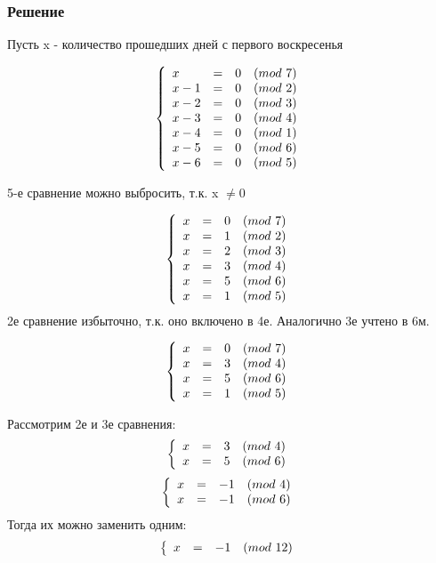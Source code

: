 \documentclass[10pt,a4paper]{article}
\begin{document}
\subsubsection*{Решение}
Пусть x - количество прошедших дней с первого воскресенья

\[
\left\{ \begin{array}{llll}
x& = &0 &(mod\ 7)\\
x - 1& = &0 & (mod\ 2)\\
x - 2& = &0 &(mod\ 3)\\
x - 3& = &0 &(mod\ 4)\\
x - 4& = &0 &(mod\ 1)\\
x - 5& = &0 &(mod\ 6)\\
x - 6& = &0 &(mod\ 5)\\
\end{array}
\right. \\
\]

5-е сравнение можно выбросить, т.к. x $\neq 0$

\[
\left\{ \begin{array}{llll}
x& = &0 &(mod\ 7)\\
x & = &1& (mod\ 2)\\
x & = &2& (mod\ 3)\\
x & = &3& (mod\ 4)\\
x & = &5& (mod\ 6)\\
x & = &1& (mod\ 5)\\
\end{array}
\right. \\
\]
2е сравнение избыточно, т.к. оно включено в 4е. Аналогично 3е учтено в
6м. 

\[
\left\{ \begin{array}{llll}
x& = &0 &(mod\ 7)\\
x & = &3 &(mod\ 4)\\
x & = &5 &(mod\ 6)\\
x & = &1 &(mod\ 5)\\
\end{array}
\right. \\
\]

Рассмотрим 2е и 3е сравнения:
\[
\left\{ \begin{array}{llll}
x & = &3 &(mod\ 4)\\
x & = &5 &(mod\ 6)\\
\end{array}
\right. \\
\]
\[
\left\{ \begin{array}{llll}
x & = &-1 &(mod\ 4)\\
x & = &-1 &(mod\ 6)\\
\end{array}
\right. \\
\]
Тогда их можно заменить одним:
\[
\left\{ \begin{array}{llll}
x & = &-1 &(mod\ 12)\\
\end{array}
\right. \\
\]
\end{document}
